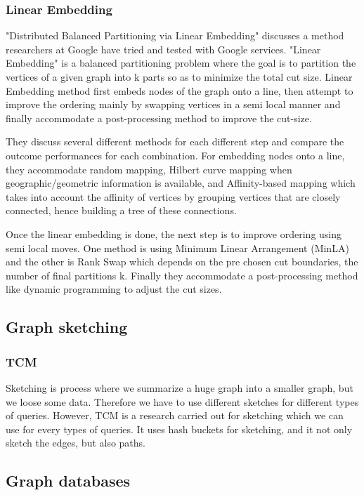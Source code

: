 \documentclass[12pt]{article}
\begin{document}
\subsubsection{Linear Embedding}

"Distributed Balanced Partitioning via Linear Embedding"\cite{Linear Embedding} discusses a method researchers at Google have tried and tested with Google services. "Linear Embedding" is a balanced partitioning problem where the goal is to partition the vertices of a given graph into k parts so as to minimize the total cut size. Linear Embedding method first embeds nodes of the graph onto a line, then attempt to improve the ordering mainly by swapping vertices in a semi local manner and finally accommodate a post-processing method to improve the cut-size.

They discuss several different methods for each different step and compare the outcome performances for each combination. For embedding nodes onto a line,  they accommodate random mapping, Hilbert curve mapping when geographic/geometric information is available, and Affinity-based mapping which takes into account the affinity of vertices by grouping vertices that are closely connected, hence building a tree of these connections.

Once the linear embedding is done, the next step is to  improve ordering using semi local moves. One method is using Minimum Linear Arrangement (MinLA)\cite{MinLA} and the other is Rank Swap which depends on the pre chosen cut boundaries, the number of final partitions k. Finally they accommodate a post-processing method like dynamic programming to adjust the cut sizes.

\subsection{Graph sketching}
\subsubsection{TCM}
Sketching is process where we summarize a huge graph into a smaller graph, but we loose some data. Therefore we have to use different sketches for different types of queries. However, TCM is a research carried out for sketching which we can use for every types of queries. It uses hash buckets for sketching, and it not only sketch the edges, but also paths.

\subsection{Graph databases}
\end{document}
